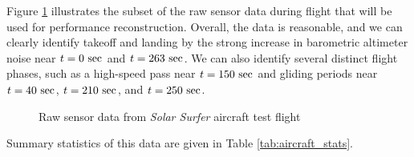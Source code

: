 Figure \ref{fig:raw_flight_data} illustrates the subset of the raw sensor data during flight that will be used for performance reconstruction. Overall, the data is reasonable, and we can clearly identify takeoff and landing by the strong increase in barometric altimeter noise near $t=0\ \rm sec$ and $t=263\ \rm sec$. We can also identify several distinct flight phases, such as a high-speed pass near $t=150\ \rm sec$ and gliding periods near $t=40\ \rm sec$, $t=210\ \rm sec$, and $t=250\ \rm sec$.

\begin{figure}[h]
    \centering
    \caption{Raw sensor data from \emph{Solar Surfer} aircraft test flight}
    \label{fig:raw_flight_data}
\end{figure}

Summary statistics of this data are given in Table \ref{tab:aircraft_stats}.

